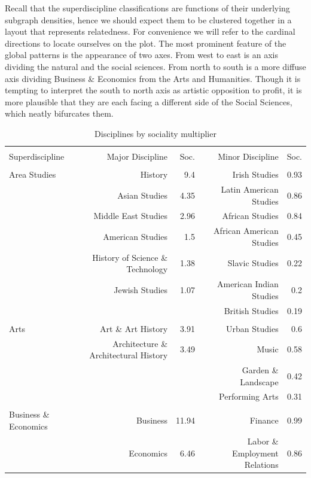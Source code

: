 \documentclass[]{book}
\theoremstyle{definition}
\theoremstyle{definition}
\theoremstyle{definition}
\theoremstyle{remark}
\begin{document}
Recall that the superdiscipline classifications are functions of their
underlying subgraph densities, hence we should expect them to be
clustered together in a layout that represents relatedness. For
convenience we will refer to the cardinal directions to locate ourselves
on the plot. The most prominent feature of the global patterns is the
appearance of two axes. From west to east is an axis dividing the
natural and the social sciences. From north to south is a more diffuse
axis dividing Business \& Economics from the Arts and Humanities. Though
it is tempting to interpret the south to north axis as artistic
opposition to profit, it is more plausible that they are each facing a
different side of the Social Sciences, which neatly bifurcates them.

\begin{table}[!htbp] \centering 
  \caption{Disciplines by sociality multiplier} 
  \label{tab:jclum} 
\begin{tabular}{@{\extracolsep{5pt}} lrrrr} 
\\[-1.8ex]\hline 
\hline \\[-1.8ex] 
Superdiscipline & Major Discipline & Soc. & Minor Discipline & Soc.  \\ 
\hline \\[-1.8ex] 
Area Studies & History & 9.4 & Irish Studies & 0.93 \\ 
 & Asian Studies & 4.35 & Latin American Studies & 0.86 \\ 
 & Middle East Studies & 2.96 & African Studies & 0.84 \\ 
 & American Studies & 1.5 & African American Studies & 0.45 \\ 
 & History of Science \& Technology & 1.38 & Slavic Studies & 0.22 \\ 
 & Jewish Studies & 1.07 & American Indian Studies & 0.2 \\ 
 &  &  & British Studies & 0.19 \\ 
 &  &  &  &  \\ 
Arts & Art \& Art History & 3.91 & Urban Studies & 0.6 \\ 
 & Architecture \& Architectural History & 3.49 & Music & 0.58 \\ 
 &  &  & Garden \& Landscape & 0.42 \\ 
 &  &  & Performing Arts & 0.31 \\ 
 &  &  &  &  \\ 
Business \& Economics & Business & 11.94 & Finance & 0.99 \\ 
 & Economics & 6.46 & Labor \& Employment Relations & 0.86 \\ 

\end{tabular}
\end{table}
\end{document}
